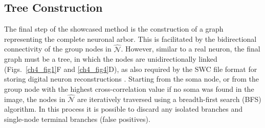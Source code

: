 \subsection{Tree Construction}
\label{subsec:tree-construction}
The final step of the showcased method is the construction of a graph representing the complete neuronal arbor. This is facilitated by the bidirectional connectivity of the group nodes in $\hat{\mathcal{N}}$. However, similar to a real neuron, the final graph must be a tree, in which the nodes are unidirectionally linked (Figs.~\ref{ch4_fig1}F and \ref{ch4_fig4}D), as also required by the SWC file format for storing digital neuron reconstructions \cite{stockley1993system, cannon1998line}. Starting from the soma node, or from the group node with the highest cross-correlation value if no soma was found in the image, the nodes in $\hat{\mathcal{N}}$ are iteratively traversed using a breadth-first search (BFS) algorithm. In this process it is possible to discard any isolated branches and single-node terminal branches (false positives).

